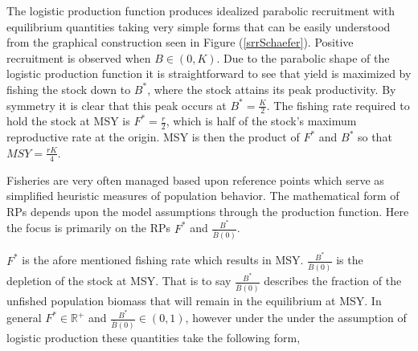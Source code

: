 \documentclass[12pt]{article}
\begin{document}
%
The logistic production function produces idealized parabolic recruitment with 
equilibrium quantities taking very simple forms that can be easily understood from the 
graphical construction seen in Figure (\ref{srrSchaefer}). Positive 
recruitment is observed when \mbox{$B\in(0, K)$.} Due to the parabolic shape of the 
logistic production function it is straightforward to see that yield is maximized 
by fishing the stock down to $B^*$, where the stock attains its peak productivity. 
By symmetry it is clear that this peak occurs at $B^*=\frac{K}{2}$. The fishing 
rate required to hold the stock at MSY is $F^*=\frac{r}{2}$, which is half of the 
stock's maximum reproductive rate at the origin. MSY is then the product of $F^*$ 
and $B^*$ so that $MSY=\frac{rK}{4}$.


Fisheries are very often managed based upon reference points which serve as 
simplified heuristic measures of population behavior. The mathematical form of 
RPs depends upon the model assumptions through the production function. %
Here the focus is primarily on the RPs $F^*$ and $\frac{B^*}{\bar B(0)}$. 


%
$F^*$ is the afore mentioned fishing rate which results in MSY. $\frac{B^*}{\bar B(0)}$ 
is the depletion of the stock at MSY. That is to say $\frac{B^*}{\bar B(0)}$ describes 
the fraction of the unfished population biomass that will remain in the equilibrium 
at MSY. In general $F^*\in\mathbb{R}^+$ and \mbox{$\frac{B^*}{\bar B(0)}\in\left(0, 1\right)$,} 
however under the under the assumption of logistic production these 
quantities take the following form,  
\end{document}
